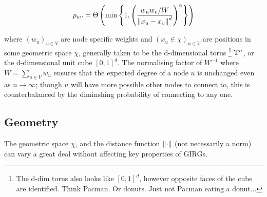 
\begin{equation}
    p_{uv} = \Theta \left ( \min \left \{ 
        1,
        \left (
            \frac{w_u w_v / W}{\left\lVert x_u - x_v\right\rVert^d}
        \right )^\alpha    
    \right \}
    \right )
\end{equation}

where $(w_u)_{u \in V}$ are node specific weights and $(x_u \in \chi)_{u \in V}$ are positions in some geometric space $\chi$, generally taken to be the d-dimensional torus
\footnote{The d-dim torus also looks like $[0, 1]^d$, however opposite faces of the cube are identified. Think Pacman. Or donuts. Just not Pacman eating a donut...}
$\mathbb{T}^n$, or the d-dimensional unit cube $[0, 1]^d$.
The normalising factor of $W^{-1}$ where $W = \sum_{u \in V} w_u$ ensures that the expected degree of a node $u$ is unchanged even as $n \to \infty$; though $u$ will have more possible other nodes to connect to, this is counterbalanced by the diminshing probability of connecting to any one.





\subsection{Geometry}
The geometric space $\chi$, and the distance function $\left\lVert \cdot\right\rVert$ (not necessarily a norm) can vary a great deal without affecting key properties of GIRGs.


